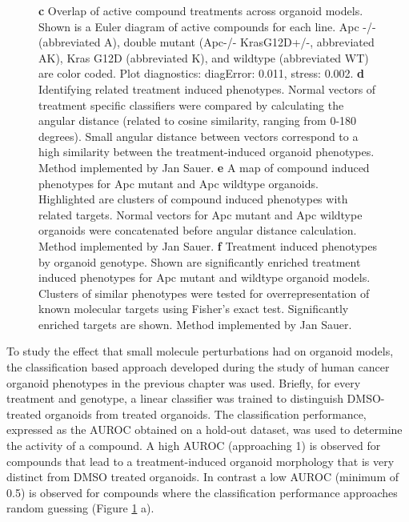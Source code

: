 \begin{flushleft}
\begin{figure}[h!]
{\textbf{c} Overlap of active compound treatments across organoid models. Shown is a Euler diagram of active compounds for each line. Apc -/- (abbreviated A), double mutant (Apc-/- KrasG12D+/-, abbreviated AK), Kras G12D (abbreviated K), and wildtype (abbreviated WT) are color coded. Plot diagnostics: diagError: 0.011, stress: 0.002.
\textbf{d} Identifying related treatment induced phenotypes. Normal vectors of treatment specific classifiers were compared by calculating the angular distance (related to cosine similarity, ranging from 0-180 degrees). Small angular distance between vectors correspond to a high similarity between the treatment-induced organoid phenotypes. Method implemented by Jan Sauer.
\textbf{e} A map of compound induced phenotypes for Apc mutant and Apc wildtype organoids. Highlighted are clusters of compound induced phenotypes with related targets. Normal vectors for Apc mutant and Apc wildtype organoids were concatenated before angular distance calculation. Method implemented by Jan Sauer.
\textbf{f} Treatment induced phenotypes by organoid genotype. Shown are significantly enriched treatment induced phenotypes for Apc mutant and wildtype organoid models. Clusters of similar phenotypes were tested for overrepresentation of known molecular targets using Fisher’s exact test. Significantly enriched targets are shown. Method implemented by Jan Sauer.
}
\label{fig_150}
\end{figure}
\bigbreak

To study the effect that small molecule perturbations had on organoid models, the classification based approach developed during the study of human cancer organoid phenotypes in the previous chapter was used. Briefly, for every treatment and genotype, a linear classifier was trained to distinguish DMSO-treated organoids from treated organoids. The classification performance, expressed as the AUROC obtained on a hold-out dataset, was used to determine the activity of a compound. A high AUROC (approaching 1) is observed for compounds that lead to a treatment-induced organoid morphology that is very distinct from DMSO treated organoids. In contrast a low AUROC (minimum of 0.5) is observed for compounds where the classification performance approaches random guessing (Figure \ref{fig_150} a).


\end{flushleft}
